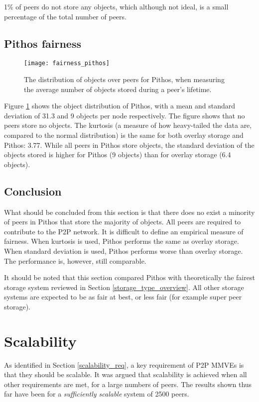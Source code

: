 1\% of peers do not store any objects, which although not ideal, is a small percentage of the total number of peers.

\subsection{Pithos fairness}

\begin{figure}[htbp]
 \centering
 \texttt{[image: fairness\_pithos]}
 \caption{The distribution of objects over peers for Pithos, when measuring the average number of objects stored during a peer's lifetime.}
 \label{fig_pithos_fairness}
\end{figure}
%
Figure \ref{fig_pithos_fairness} shows the object distribution of Pithos, with a mean and standard deviation of 31.3 and 9 objects per node respectively. The figure shows that no peers store no objects. The kurtosis (a measure of how heavy-tailed the data are, compared to the normal distribution) is the same for both overlay storage and Pithos: 3.77. While all peers in Pithos store objects, the standard deviation of the objects stored is higher for Pithos (9 objects) than for overlay storage (6.4 objects).

\subsection{Conclusion}
What should be concluded from this section is that there does no exist a minority of peers in Pithos that store the majority of objects. All peers are required to contribute to the P2P network. It is difficult to define an empirical measure of fairness. When kurtosis is used, Pithos performs the same as overlay storage. When standard deviation is used, Pithos performs worse than overlay storage. The performance is, however, still comparable.

It should be noted that this section compared Pithos with theoretically the fairest storage system reviewed in Section \ref{storage_type_overview}. All other storage systems are expected to be as fair at best, or less fair (for example super peer storage).

\section{Scalability}

As identified in Section \ref{scalability_req}, a key requirement of P2P MMVEs is that they should be scalable. It was argued that scalability is achieved when all other requirements are met, for a large numbers of peers. The results shown thus far have been for a \emph{sufficiently scalable} system of 2500 peers.

